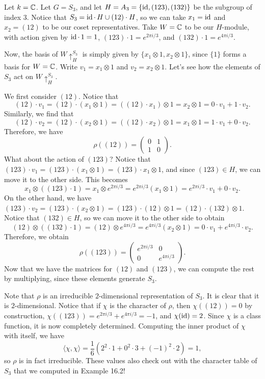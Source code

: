 \begin{exmp}{}
    Let $k = \mathbb{C}$. Let $G = S_3$, and let $H = A_3 = \{\operatorname{id}, (123), (132)\}$ be the 
    subgroup of index $3$. Notice that $S_3 = \operatorname{id} \cdot\,H \cup (12) \cdot H$, 
    so we can take $x_1 = \operatorname{id}$ and $x_2 = (12)$ to be our coset representatives. 
    Take $W = \mathbb{C}$ to be our $H$-module, with action given by 
    $\operatorname{id} \cdot\,1 = 1$, $(123) \cdot 1 = e^{2\pi i/3}$, 
    and $(132) \cdot 1 = e^{4\pi i/3}$.

    Now, the basis of $W \uparrow_H^{S_3}$ is simply given by $\{x_1 \otimes 1, 
    x_2 \otimes 1\}$, since $\{1\}$ forms a basis for $W = \mathbb{C}$. Write 
    $v_1 = x_1 \otimes 1$ and $v_2 = x_2 \otimes 1$. Let's see how the elements 
    of $S_3$ act on $W \uparrow_H^{S_3}$. 

    We first consider $(12)$. Notice that 
    \[ (12) \cdot v_1 = (12) \cdot (x_1 \otimes 1) = 
    ((12) \cdot x_1) \otimes 1 = x_2 \otimes 1 = 0 \cdot v_1 + 1 \cdot v_2. \] 
    Similarly, we find that 
    \[ (12) \cdot v_2 = (12) \cdot (x_2 \otimes 1) = 
    ((12) \cdot x_2) \otimes 1 = x_1 \otimes 1 = 1 \cdot v_1 + 0 \cdot v_2. \] 
    Therefore, we have 
    \[ \rho((12)) = \begin{pmatrix}
        0 & 1 \\ 
        1 & 0 
    \end{pmatrix}. \] 
    \newpage 
    What about the action of $(123)$? Notice that $(123) \cdot v_1 = 
    (123) \cdot (x_1 \otimes 1) = (123) \cdot x_1 \otimes 1$, and since 
    $(123) \in H$, we can move it to the other side. This becomes 
    \[ x_1 \otimes ((123) \cdot 1) = x_1 \otimes e^{2\pi i/3} = 
    e^{2\pi i/3} (x_1 \otimes 1) = e^{2\pi i/3} \cdot v_1 + 0 \cdot v_2. \] 
    On the other hand, we have $(123) \cdot v_2 = (123) \cdot (x_2 \otimes 1) 
    = (123) \cdot (12) \otimes 1 = (12) \cdot (132) \otimes 1$. Notice that 
    $(132) \in H$, so we can move it to the other side to obtain 
    \[ (12) \otimes ((132) \cdot 1) = (12) \otimes e^{4\pi i/3} 
    = e^{4\pi i/3} (x_2 \otimes 1) = 0 \cdot v_1 + e^{4\pi i/3} \cdot v_2. \] 
    Therefore, we obtain 
    \[ \rho((123)) = \begin{pmatrix}
        e^{2\pi i/3} & 0 \\ 
        0 & e^{4\pi i/3}
    \end{pmatrix}. \] 
    Now that we have the matrices for $(12)$ and $(123)$, we can compute the 
    rest by multiplying, since these elements generate $S_3$. 

    Note that $\rho$ is an irreducible $2$-dimensional representation of $S_3$. 
    It is clear that it is $2$-dimensional. Notice that if $\chi$ is the 
    character of $\rho$, then $\chi((12)) = 0$ by construction, 
    $\chi((123)) = e^{2\pi i/3} + e^{4\pi i/3} = -1$, and $\chi(\operatorname{id}) = 2$. Since 
    $\chi$ is a class function, it is now completely determined. Computing the 
    inner product of $\chi$ with itself, we have 
    \[ \langle \chi, \chi \rangle = \frac{1}{6}(2^2 \cdot 1 + 0^2 \cdot 3 
    + (-1)^2 \cdot 2) = 1, \] 
    so $\rho$ is in fact irreducible. These values also check out with the 
    character table of $S_3$ that we computed in Example 16.2!
\end{exmp}
